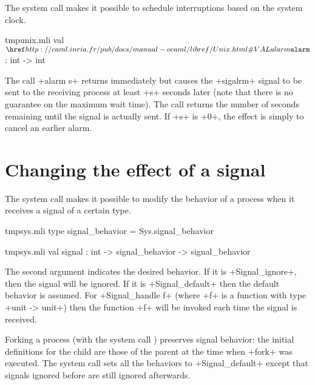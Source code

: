 The system call  makes it possible to schedule
interruptions based on the system clock.

%
\begin{listingcodefile}{tmpunix.mli}
val $\libvalue{Unix}{alarm}$ : int -> int
\end{listingcodefile}
%

The call \ml+alarm s+ returns immediately but causes the \ml+sigalrm+ 
signal to be sent to the receiving process at least \ml+s+ seconds later 
(note that there is no guarantee on the maximum wait time).  The call returns 
the number of seconds remaining until the signal is actually sent.  
If \ml+s+ is \ml+0+, the effect is simply to cancel an earlier alarm.

\section{Changing the effect of a signal}

The system call  makes it possible to modify the behavior
of a process when it receives a signal of a certain type.

%
\begin{codefile}{tmpsys.mli}
type signal_behavior = Sys.signal_behavior
\end{codefile}
%
\begin{listingcodefile}{tmpsys.mli}
val signal : int -> signal_behavior -> signal_behavior
\end{listingcodefile}
%

The second argument indicates the desired behavior.  If it is
\ml+Signal_ignore+, then the signal will be ignored.  If it is 
\ml+Signal_default+ then the default behavior is assumed.  For
\ml+Signal_handle f+ (where \ml+f+ is a function with type 
\ml+unit -> unit+) then the function \ml+f+ will be 
invoked each time the signal is received.

Forking a process (with the system call ) preserves 
signal behavior: the initial definitions for the child are those of 
the parent at the time when \ml+fork+ was executed.  The  
system call sets all the behaviors to \ml+Signal_default+ except that
signals ignored before are still ignored afterwards.

